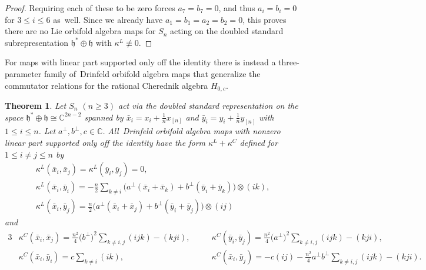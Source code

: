 \documentclass[10pt,a4paper]{amsart}
\numberwithin{equation}{section}
\newtheorem{Theorem}{Theorem}[section]
\begin{document}
\begin{proof}
Requiring each of these to be zero forces $a_7=b_7=0$, and thus $a_i=b_i=0$ for $3 \leq i \leq 6$
as~well. Since we already have $a_1=b_1=a_2=b_2=0$, this proves there are no
Lie orbifold algebra maps for $S_n$ acting on the doubled standard subrepresentation $\mathfrak{h}^* \oplus \mathfrak{h}$
with $\kappa^L \not\equiv 0$.
\end{proof}

For maps with linear part supported only off the identity there is instead a
three-parameter family of~Drinfeld orbifold algebra maps that generalize the
commutator relations for the rational Cherednik algebra $H_{0,c}$.

\begin{Theorem}
\label{thm:DOAMapsDoubledStd}
Let $S_n$ $(n \geq 3)$ act via the doubled standard representation on
the space $\mathfrak{h}^*\oplus\mathfrak{h} \cong \mathbb{C}^{2n-2}$ spanned by $\bar{x}_i=x_i+\frac{1}{n}x_{[n]}$ and $\bar{y}_i=y_i+\frac{1}{n}y_{[n]}$ with $1\leq i \leq n$. %
Let $a^\perp,b^\perp,c \in \mathbb{C}$.
All~Drinfeld orbifold algebra maps with
nonzero linear part supported only off the identity have the form
$\kappa^L+\kappa^C$
defined for $1 \leq i \neq j \leq n$ by
\begin{gather*}
\kappa^L(\bar{x}_i,\bar{x}_j)=\kappa^L(\bar{y}_i,\bar{y}_j)=0, \\
\kappa^L(\bar{x}_i,\bar{y}_i)=-\frac{n}{2}\sum\limits_{k\neq i} \big(a^\perp(\bar{x}_{i}+\bar{x}_{k})+b^\perp(\bar{y}_{i}+\bar{y}_{k})\big) \otimes (ik), \\
\kappa^L(\bar{x}_i,\bar{y}_j)=\frac{n}{2}\big(a^\perp (\bar{x}_{i}+\bar{x}_{j})+b^\perp(\bar{y}_{i}+\bar{y}_{j})\big) \otimes (ij)
\end{gather*}
and
\begin{alignat*}{3}
& \kappa^C(\bar{x}_i,\bar{x}_j)=\frac{n^2}{4}\big(b^\perp\big)^2 \sum\limits_{k\neq i,j} (ijk)-(kji), \quad&&
\kappa^C(\bar{y}_i,\bar{y}_j)=\frac{n^2}{4}\big(a^\perp\big)^2 \sum\limits_{k\neq i,j} (ijk)-(kji),& \\
&\kappa^C(\bar{x}_i,\bar{y}_i)=c\sum\limits_{k\neq i} (ik), \quad&&
\kappa^C(\bar{x}_i,\bar{y}_j)=-c(ij)-\frac{n^2}{4}a^\perp b^\perp\sum\limits_{k\neq i,j} (ijk)-(kji).&
\end{alignat*}
\end{Theorem}
\end{document}
